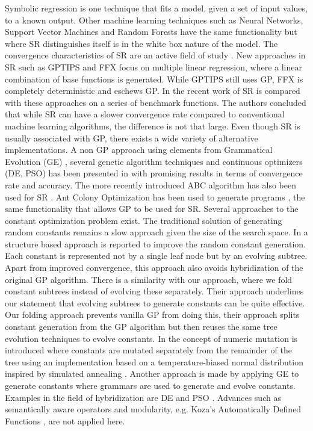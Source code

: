 Symbolic regression is one technique that fits a model, given a set of input values, to a known output. Other machine learning techniques such as Neural Networks, Support Vector Machines and Random Forests have the same functionality but where SR distinguishes itself is in the white box nature of the model. The convergence characteristics of SR are an active field of study \citep{SRAccur}. New approaches in SR such as GPTIPS and FFX \citep{GPTIPS, FFX} focus on multiple linear regression, where a linear combination of base functions is generated. While GPTIPS still uses GP, FFX is completely deterministic and eschews GP.
In the recent work of \citep{SRlinear} SR is compared with these approaches on a series of benchmark functions. The authors concluded that while SR can have a slower convergence rate compared to conventional machine learning algorithms, the difference is not that large. Even though SR is usually associated with GP, there exists a wide variety of alternative implementations.
A non GP approach using elements from Grammatical Evolution (GE) \cite{GE}, several genetic algorithm techniques and continuous optimizers (DE, PSO) has been presented in \citep{AEG} with promising results in terms of convergence rate and accuracy. The more recently introduced ABC algorithm has also been used for SR \cite{ABCSR}. Ant Colony Optimization \citep{ACO} has been used to generate programs \citep{ACOSR}, the same functionality that allows GP to be used for SR. Several approaches to the constant optimization problem exist. The traditional solution of generating random constants \citep{GP} remains a slow approach given the size of the search space. In \citep{GPConstAlter} a structure based approach is reported to improve the random constant generation. Each constant is represented not by a single leaf node but by an evolving subtree. Apart from improved convergence, this approach also avoids hybridization of the original GP algorithm. There is a similarity with our approach, where we fold constant subtrees instead of evolving these separately. Their approach underlines our statement that evolving subtrees to generate constants can be quite effective. Our folding approach prevents vanilla GP from doing this, their approach splits constant generation from the GP algorithm but then reuses the same tree evolution techniques to evolve constants. In \citep{GPConst} the concept of numeric mutation is introduced where constants are mutated separately from the remainder of the tree using an implementation based on a temperature-biased normal distribution inspired by simulated annealing \citep{SA}. Another approach is made by applying GE to generate constants \citep{GPConstGE} where grammars are used to generate and evolve constants. Examples in the field of hybridization are DE \citep{GPDE} and PSO \citep{SRBaseline}. Advances such as semantically aware operators \citep {GPSemantics} and modularity, e.g. Koza's Automatically Defined Functions \citep{GP}, are not applied here. 